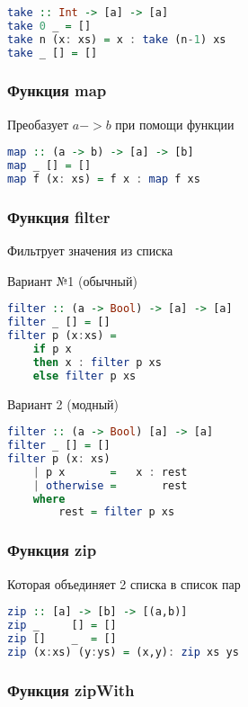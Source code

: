 \documentclass[10pt, a4paper]{article}
\begin{document}
\begin{lstlisting}[language=haskell]
take :: Int -> [a] -> [a]
take 0 _ = []
take n (x: xs) = x : take (n-1) xs
take _ [] = []
\end{lstlisting}

\subsubsection{Функция map}

Преобазует $a -> b$ при помощи функции

\begin{lstlisting}[language=haskell]
map :: (a -> b) -> [a] -> [b]
map _ [] = []
map f (x: xs) = f x : map f xs
\end{lstlisting}

\subsubsection{Функция filter}

Фильтрует значения из списка

Вариант №1 (обычный)
\begin{lstlisting}[language=haskell]
filter :: (a -> Bool) -> [a] -> [a]
filter _ [] = []
filter p (x:xs) = 
    if p x 
    then x : filter p xs 
    else filter p xs
\end{lstlisting}

Вариант 2 (модный)
\begin{lstlisting}[language=haskell]
filter :: (a -> Bool) [a] -> [a]
filter _ [] = []
filter p (x: xs)
    | p x       =   x : rest
    | otherwise =       rest
    where 
        rest = filter p xs
\end{lstlisting}

\subsubsection{Функция zip}

Которая объединяет 2 списка в список пар

\begin{lstlisting}[language=haskell]
zip :: [a] -> [b] -> [(a,b)]
zip _     [] = []
zip []    _  = []
zip (x:xs) (y:ys) = (x,y): zip xs ys
\end{lstlisting}

\subsubsection{Функция zipWith}
\end{document}
